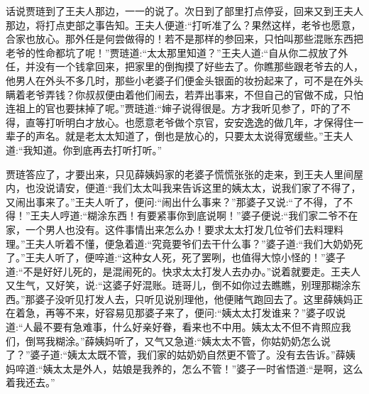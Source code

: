 


\begin{parag}
    话说贾琏到了王夫人那边，一一的说了。次日到了部里打点停妥，回来又到王夫人那边，将打点吏部之事告知。王夫人便道:“打听准了么？果然这样，老爷也愿意，合家也放心。那外任是何尝做得的！若不是那样的参回来，只怕叫那些混账东西把老爷的性命都坑了呢！”贾琏道:“太太那里知道？”王夫人道:“自从你二叔放了外任，并没有一个钱拿回来，把家里的倒掏摸了好些去了。你瞧那些跟老爷去的人，他男人在外头不多几时，那些小老婆子们便金头银面的妆扮起来了，可不是在外头瞒着老爷弄钱？你叔叔便由着他们闹去，若弄出事来，不但自己的官做不成，只怕连祖上的官也要抹掉了呢。”贾琏道:“婶子说得很是。方才我听见参了，吓的了不得，直等打听明白才放心。也愿意老爷做个京官，安安逸逸的做几年，才保得住一辈子的声名。就是老太太知道了，倒也是放心的，只要太太说得宽缓些。”王夫人道:“我知道。你到底再去打听打听。”
\end{parag}


\begin{parag}
    贾琏答应了，才要出来，只见薛姨妈家的老婆子慌慌张张的走来，到王夫人里间屋内，也没说请安，便道:“我们太太叫我来告诉这里的姨太太，说我们家了不得了，又闹出事来了。”王夫人听了，便问:“闹出什么事来？”那婆子又说:“了不得，了不得！”王夫人哼道:“糊涂东西！有要紧事你到底说啊！”婆子便说:“我们家二爷不在家，一个男人也没有。这件事情出来怎么办！要求太太打发几位爷们去料理料理。”王夫人听着不懂，便急着道:“究竟要爷们去干什么事？”婆子道:“我们大奶奶死了。”王夫人听了，便啐道:“这种女人死，死了罢咧，也值得大惊小怪的！”婆子道:“不是好好儿死的，是混闹死的。快求太太打发人去办办。”说着就要走。王夫人又生气，又好笑，说:“这婆子好混账。琏哥儿，倒不如你过去瞧瞧，别理那糊涂东西。”那婆子没听见打发人去，只听见说别理他，他便赌气跑回去了。这里薛姨妈正在着急，再等不来，好容易见那婆子来了，便问:“姨太太打发谁来？”婆子叹说道:“人最不要有急难事，什么好亲好眷，看来也不中用。姨太太不但不肯照应我们，倒骂我糊涂。”薛姨妈听了，又气又急道:“姨太太不管，你姑奶奶怎么说了？”婆子道:“姨太太既不管，我们家的姑奶奶自然更不管了。没有去告诉。”薛姨妈啐道:“姨太太是外人，姑娘是我养的，怎么不管！”婆子一时省悟道:“是啊，这么着我还去。”
\end{parag}


